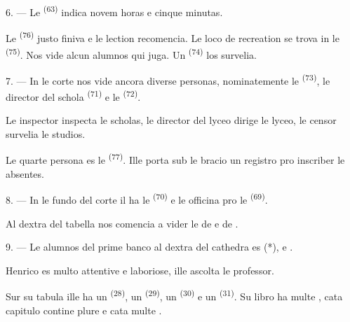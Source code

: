 6. --- Le  \textsuperscript{(63)} indica novem horas e cinque
minutas.

Le  \textsuperscript{(76)} justo finiva e le lection
recomencia. Le loco de recreation se trova in le 
\textsuperscript{(75)}. Nos vide alcun alumnos qui juga. Un 
\textsuperscript{(74)} los survelia.

7. --- In le corte nos vide ancora diverse personas, nominatemente le
 \textsuperscript{(73)}, le director del schola
 \textsuperscript{(71)} e le 
\textsuperscript{(72)}.

Le inspector inspecta le scholas, le director del lyceo dirige le lyceo, le
censor survelia le studios.

Le quarte persona es le  \textsuperscript{(77)}. Ille porta sub
le bracio un registro pro inscriber le absentes.

8. --- In le fundo del corte il ha le 
\textsuperscript{(70)} e le officina pro le 
\textsuperscript{(69)}.

Al dextra del tabella nos comencia a vider le  de
 e de .


\VUsaut{2.4mm}

\VUsaut{3.0mm}

9. --- Le alumnos del prime banco al dextra del cathedra es 
(*),  e .

Henrico es multo attentive e laboriose, ille ascolta le professor.

Sur su tabula ille ha un  \textsuperscript{(28)}, un
 \textsuperscript{(29)}, un 
\textsuperscript{(30)} e un  \textsuperscript{(31)}. Su
libro ha multe , cata capitulo contine plure
 e cata  multe .

